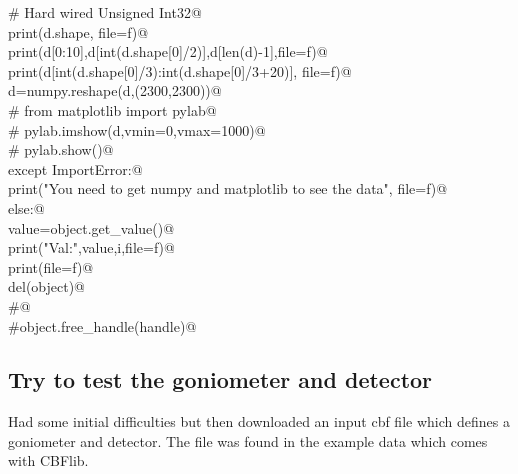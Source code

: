 \documentclass[10pt,a4paper,twoside,notitlepage]{article}
\begin{document}
\begin{flushleft}
\begin{minipage}{\linewidth}
\begin{list}{}{}
\mbox{}\verb@                       # Hard wired Unsigned Int32@\\
\mbox{}\verb@                       print(d.shape, file=f)@\\
\mbox{}\verb@                       print(d[0:10],d[int(d.shape[0]/2)],d[len(d)-1],file=f)@\\
\mbox{}\verb@                       print(d[int(d.shape[0]/3):int(d.shape[0]/3+20)], file=f)@\\
\mbox{}\verb@                       d=numpy.reshape(d,(2300,2300))@\\
\mbox{}\verb@    #                   from matplotlib import pylab@\\
\mbox{}\verb@    #                   pylab.imshow(d,vmin=0,vmax=1000)@\\
\mbox{}\verb@    #                   pylab.show()@\\
\mbox{}\verb@                    except ImportError:@\\
\mbox{}\verb@                       print("You need to get numpy and matplotlib to see the data", file=f)@\\
\mbox{}\verb@                else:@\\
\mbox{}\verb@                    value=object.get_value()@\\
\mbox{}\verb@                    print("Val:",value,i,file=f)@\\
\mbox{}\verb@        print(file=f)@\\
\mbox{}\verb@    del(object)@\\
\mbox{}\verb@    #@\\
\mbox{}\verb@    #object.free_handle(handle)@\\
\mbox{}\verb@@{\NWsep}
\end{list}
\vspace{-1.5ex}
\footnotesize
\begin{list}{}{\setlength{\itemsep}{-\parsep}\setlength{\itemindent}{-\leftmargin}}

\item{}
\end{list}
\end{minipage}\vspace{4ex}
\end{flushleft}
\subsection{Try to test the goniometer and detector}

Had some initial difficulties but then downloaded an input cbf file which defines 
a goniometer and detector. 
The file was found in the example data which comes with CBFlib.
\end{document}
